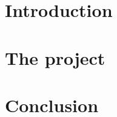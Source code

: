 \documentclass[UKenglish]{uiomasterthesis}  %
\begin{document}
\mainmatter{}
\part{Introduction}





\part{The project}





\part{Conclusion}







\backmatter{}
\printbibliography{}

\end{document}
